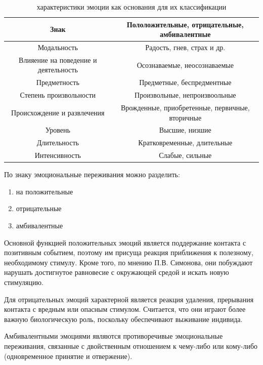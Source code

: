 \begin{table}[H]
\caption{характеристики эмоции как основания для их классификации}
\label{tbl:text_a00}
\begin{center}

\begin{tabular}{ | c | c | }
	\hline
	Знак & Пололожительные, отрицательные, амбивалентные \\ \hline 
	Модальность & Радость, гнев, страх и др. \\ \hline
	Влияение на поведение и деятельность & Осознаваемые, неосознаваемые \\ \hline
	Предметность	& Предметные, беспредментные \\ \hline
	Степень произвольности & Произвольные, непроизвоольные \\ \hline
	Происхождение и развлечения & Врожденные, приобретенные, первичные, вторичные \\ \hline
	Уровень & Высшие, низшие \\ \hline
	Длительность & Кратковременные, длительные \\ \hline
	Интенсивность & Слабые, сильные \\ \hline
\end{tabular}
\end{center}
\end{table}

По знаку эмоциональные переживания можно разделить:
\begin{enumerate}
	\item на положительные
	\item отрицательные
	\item амбивалентные
\end{enumerate}

Основной функцией положительных эмоций является поддержание контакта с позитивным событием, поэтому им присуща реакция приближения к полезному, 
необходимому стимулу. Кроме того, по мнению П.В. Симонова, они побуждают нарушать достигнутое равновесие с окружающей средой и искать новую стимуляцию.

Для отрицательных эмоций характерной является реакция удаления, прерывания контакта с вредным или опасным стимулом.
Считается, что они играют более важную биологическую роль, поскольку обеспечивают выживание индивида.

Амбивалентными эмоциями являются противоречивые эмоциональные переживания, связанные с двойственным отношением к чему-либо или кому-либо (одновременное принятие и отвержение).

